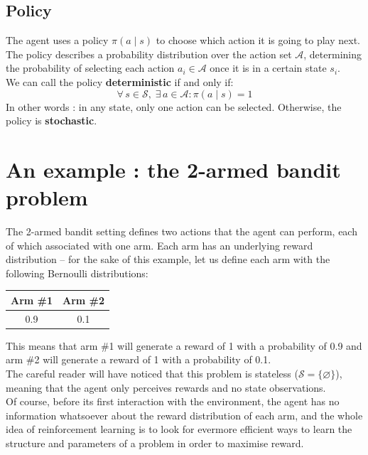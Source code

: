 \subsection{Policy}
\label{sec:policy}
The agent uses a policy $\pi(a \mid s)$ to choose which action it is
going to play next. The policy describes a probability
distribution over the action set $\mathcal{A}$, determining the probability of
selecting each action $a_i \in \mathcal{A}$ once it is
in a certain state $s_i$.\\

We can call the policy \textbf{deterministic} if and only if:
\begin{equation}
\forall\, s \in \mathcal{S},\; \exists\, a \in \mathcal{A} : \pi(a \mid s) = 1
\end{equation}
\noindent In other words : in any state, only one action can be selected.
Otherwise, the policy is \textbf{stochastic}.

\section{An example : the 2-armed bandit problem}
\label{sec:rl_example}
The 2-armed bandit setting defines two actions that the agent can perform,
each of which associated with one arm. Each arm has an underlying reward
distribution -- for the sake of this example, let us define each arm with the
following Bernoulli distributions: 

\begin{table}[H]
	\centering
	\begin{tabular}{c|c}
		Arm \#1 & Arm \#2 \\ \hline
		0.9 & 0.1
	\end{tabular}
\end{table}

\noindent This means that arm \#1 will generate a reward of 1 with a probability
of 0.9 and arm \#2 will generate a reward of 1 with a probability of 0.1.\\

The careful reader will have noticed that this problem is stateless 
($\mathcal{S} = \{\varnothing\}$), meaning that the agent only perceives
rewards and no state observations.\\

Of course, before its first interaction with the environment, the agent has no
information whatsoever about the reward distribution of each arm, and the whole
idea of reinforcement learning is to look for evermore efficient ways to learn
the structure and parameters of a problem in order to maximise reward.\\

